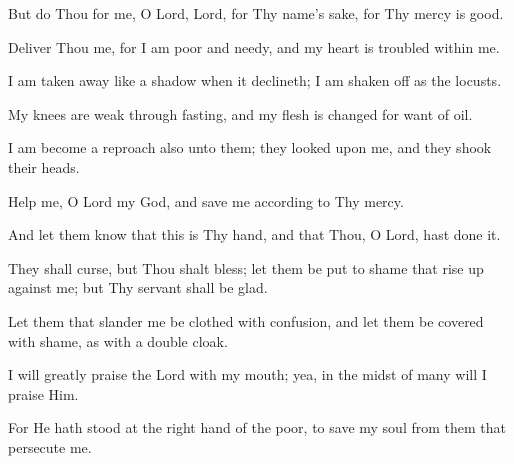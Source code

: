 But do Thou for me, O Lord, Lord, for Thy name's sake, for Thy mercy is good.

Deliver Thou me, for I am poor and needy, and my heart is troubled within me.

I am taken away like a shadow when it declineth; I am shaken off as the locusts.

My knees are weak through fasting, and my flesh is changed for want of oil.

I am become a reproach also unto them; they looked upon me, and they shook their heads.

Help me, O Lord my God, and save me according to Thy mercy.

And let them know that this is Thy hand, and that Thou, O Lord, hast done it.

They shall curse, but Thou shalt bless; let them be put to shame that rise up against me; but Thy servant shall be glad.

Let them that slander me be clothed with confusion, and let them be covered with shame, as with a double cloak.

I will greatly praise the Lord with my mouth; yea, in the midst of many will I praise Him.

For He hath stood at the right hand of the poor, to save my soul from them that persecute me.
